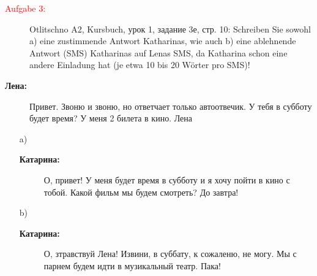 \documentclass[a4paper]{article}
\theoremstyle{plain}
\begin{document}
\begin{description}
 	\item[\textcolor{red}{Aufgabe 3:}] Otlitschno A2, Kursbuch, урок 1, задание 3е, стр. 10: Schreiben Sie sowohl a) eine zustimmende Antwort Katharinas, wie auch b) eine ablehnende Antwort (SMS) Katharinas auf Lenas SMS, da Katharina schon eine andere Einladung hat (je etwa 10 bis 20 Wörter pro SMS)! 
\end{description}
\vspace*{1cm}


\begin{description}
    \item[\textbf{Лена:}] Привет. Звоню и звоню, но ответчает только автоотвечик. У тебя в субботу будет время? У меня 2 билета в кино. Лена 
\end{description}


\begin{itemize}
	\item[a)] 
	    \begin{description}
            \item[\textbf{Катарина:}] О, привет! У меня будет время в субботу и я хочу пойти в кино с тобой. Какой фильм мы будем смотреть? До завтра! 
        \end{description}
	\item[b)] 
	    \begin{description}
            \item[\textbf{Катарина:}] О, зтравствуй Лена! Извини, в суббату, к сожаленю, не могу. Мы с парнем будем идти в музикальный театр. Пака! 
        \end{description}
\end{itemize}
\end{document}
